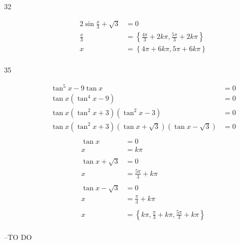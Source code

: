 \documentclass{exam}
\begin{document}
\begin{description}
      \item[32] 
        \begin{align*}
          2 \sin \frac{x}{3} + \sqrt{3} & = 0 \\
          \frac{x}{3}                   & = \left\{ \frac{4 \pi}{3} + 2k \pi, \frac{5 \pi}{3} + 2k \pi \right\} \\
          x                             & = \boxed{ \left\{ 4 \pi + 6k \pi, 5 \pi + 6k \pi \right\} } \\
        \end{align*}

      \item[35] 
        \begin{align*}
          \tan^5 x - 9 \tan x                                            & = 0 \\
          \tan x \left( \tan^4 x - 9 \right)                             & = 0 \\
          \tan x \left( \tan^2 x + 3 \right) \left( \tan^2 x - 3 \right) & = 0 \\
          \tan x \left( \tan^2 x + 3 \right) (\tan x + \sqrt{3}) (\tan x - \sqrt{3}) & = 0 \\
        \end{align*}
        \begin{align*}
          \tan x & = 0 \\
          x      & = k \pi \\
          \\
          \tan x + \sqrt{3} & = 0 \\
          x                 & = \frac{5 \pi}{3} + k \pi \\
          \\
          \tan x - \sqrt{3} & = 0 \\
          x                 & = \frac{\pi}{3} + k \pi \\
          \\
          x & = \boxed{ \left\{ k \pi, \frac{\pi}{3} + k \pi, \frac{5 \pi}{3} + k \pi \right\} } \\
        \end{align*}

    \end{description}

  \else
    \vspace{5 cm}

    \begin{quote}
      \begin{em}
      \end{em}
    \end{quote}
    \hspace{1 cm} --TO DO
  \fi
\end{document}
